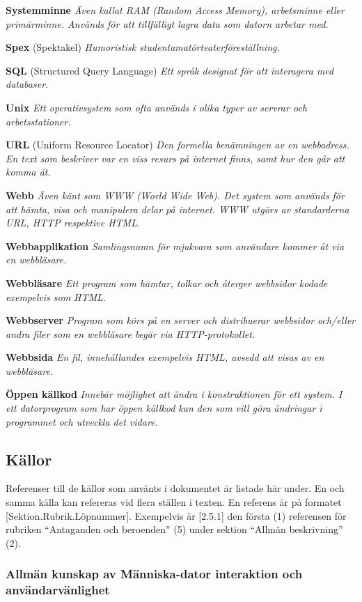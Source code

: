 \documentclass[a4paper, twoside, 11pt, titlepage]{article}
\begin{document}
	\textbf{Systemminne} \emph{Även kallat RAM (Random Access Memory), arbetsminne eller primärminne. Används för att tillfälligt lagra data som datorn arbetar med.}

	\textbf{Spex} (Spektakel) \emph{Humoristisk studentamatörteaterföreställning.}

	\textbf{SQL} (Structured Query Language) \emph{Ett språk designat för att interagera med databaser.}

	\textbf{Unix} \emph{Ett operativsystem som ofta används i olika typer av servrar och arbetsstationer.}

	\textbf{URL} (Uniform Resource Locator) \emph{Den formella benämningen av en webbadress. En text som beskriver var en viss resurs på internet finns, samt hur den går att komma åt.}

	\textbf{Webb} \emph{Även känt som WWW (World Wide Web). Det system som används för att hämta, visa och manipulera delar på internet. WWW utgörs av standarderna URL, HTTP respektive HTML.}

	\textbf{Webbapplikation} \emph{Samlingsnamn för mjukvara som användare kommer åt via en webbläsare.}

	\textbf{Webbläsare} \emph{Ett program som hämtar, tolkar och återger webbsidor kodade exempelvis som HTML.}

	\textbf{Webbserver} \emph{Program som körs på en server och distribuerar webbsidor och/eller andra filer som en webbläsare begär via HTTP-protokollet.}

	\textbf{Webbsida} \emph{En fil, innehållandes exempelvis HTML, avsedd att visas av en webbläsare.}

	\textbf{Öppen källkod} \emph{Innebär möjlighet att ändra i konstruktionen för ett system. I ett datorprogram som har öppen källkod kan den som vill göra ändringar i programmet och utveckla det vidare.}

	\subsection{Källor}


	Referenser till de källor som använts i dokumentet är listade här under. En och samma källa kan refereras vid flera ställen i texten. En referens är på formatet [Sektion.Rubrik.Löpnummer]. Exempelvis är [2.5.1] den första (1) referensen för rubriken ``Antaganden och beroenden'' (5) under sektion ``Allmän beskrivning'' (2).

		\subsubsection{Allmän kunskap av Människa-dator interaktion och användarvänlighet}
\end{document}
